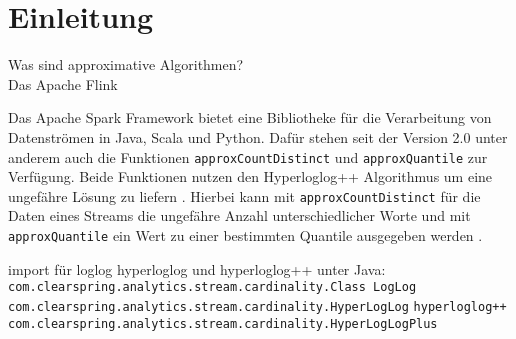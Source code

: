 \section{Einleitung}
Was sind approximative Algorithmen?\\




Das Apache Flink \cite{quoc2019}

Das Apache Spark Framework bietet eine Bibliotheke für die Verarbeitung von Datenströmen in Java, Scala und Python. Dafür stehen seit der Version 2.0 unter anderem auch die Funktionen \texttt{approxCountDistinct} und \texttt{approxQuantile} zur Verfügung. 
Beide Funktionen nutzen den Hyperloglog++ Algorithmus um eine ungefähre Lösung zu liefern \cite{hunter2016}.
Hierbei kann mit \texttt{approxCountDistinct} für die Daten eines Streams die ungefähre Anzahl unterschiedlicher Worte und mit \texttt{approxQuantile} ein Wert zu einer bestimmten Quantile ausgegeben werden \cite{hunter2016}. 

import für loglog hyperloglog und hyperloglog++ unter Java:
\texttt{com.clearspring.analytics.stream.cardinality.Class LogLog}
\texttt{com.clearspring.analytics.stream.cardinality.HyperLogLog}
\texttt{hyperloglog++ com.clearspring.analytics.stream.cardinality.HyperLogLogPlus}



